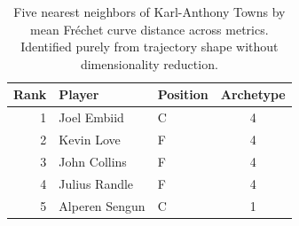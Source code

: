 \begin{table}[htbp]
  \centering\small
  \begin{tabular}{rllc}
    \toprule
    Rank & Player & Position & Archetype \\
    \midrule
    1 & Joel Embiid & C & 4 \\
    2 & Kevin Love & F & 4 \\
    3 & John Collins & F & 4 \\
    4 & Julius Randle & F & 4 \\
    5 & Alperen Sengun & C & 1 \\
    \bottomrule
  \end{tabular}
  \caption{Five nearest neighbors of Karl-Anthony Towns by mean Fr\'{e}chet curve distance across metrics. Identified purely from trajectory shape without dimensionality reduction.}
  \label{tab:Karl_Anthony_Towns_frechet_curve_neighbors}
\end{table}

